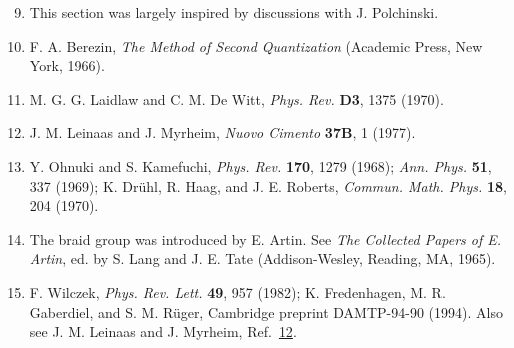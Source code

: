 \begin{enumerate}
\setcounter{enumi}{8}
\item\label{ref:9.9} This section was largely inspired by discussions with J. Polchinski.

\item\label{ref:9.10} F. A. Berezin, \emph{The Method of Second Quantization} (Academic
  Press, New York, 1966).

\item\label{ref:9.11} M. G. G. Laidlaw and C. M. De Witt, \emph{Phys. Rev.} \textbf{D3},
  1375 (1970).

\item\label{ref:9.12} J. M. Leinaas and J. Myrheim, \emph{Nuovo Cimento} \textbf{37B},
  1 (1977).

\item\label{ref:9.13} Y. Ohnuki and S. Kamefuchi, \emph{Phys. Rev.} \textbf{170}, 1279
  (1968); \emph{Ann. Phys.} \textbf{51}, 337 (1969); K. Dr\"uhl, R. Haag,
  and J. E. Roberts, \emph{Commun. Math. Phys.} \textbf{18}, 204 (1970).

\item\label{ref:9.14} The braid group was introduced by E. Artin. See \emph{The Collected
  Papers of E. Artin}, ed. by S. Lang and J. E. Tate (Addison-Wesley,
  Reading, MA, 1965).

\item\label{ref:9.15} F. Wilczek, \emph{Phys. Rev. Lett.} \textbf{49}, 957 (1982);
  K. Fredenhagen, M. R. Gaberdiel, and S. M. R\"uger, Cambridge preprint
  DAMTP-94-90 (1994). Also see J. M. Leinaas and J. Myrheim,
  Ref.~\hyperref[ref:9.12]{12}.
\end{enumerate}
